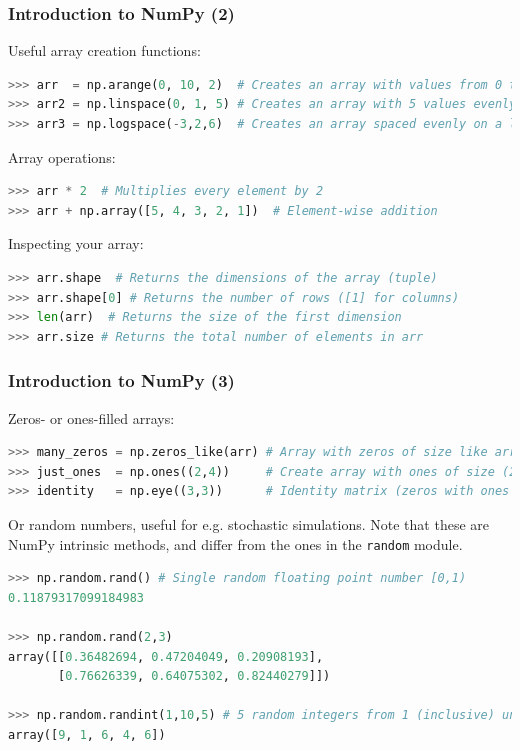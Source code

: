 \begin{frame}[fragile]
  \frametitle{Introduction to NumPy (2)}
  Useful array creation functions:
  \begin{lstlisting}[language=Python, numbers=none]
>>> arr  = np.arange(0, 10, 2)  # Creates an array with values from 0 to 10, step 2
>>> arr2 = np.linspace(0, 1, 5) # Creates an array with 5 values evenly spaced between 0 and 1
>>> arr3 = np.logspace(-3,2,6)  # Creates an array spaced evenly on a logscale
  \end{lstlisting}\pause

  Array operations:
  \begin{lstlisting}[language=Python, numbers=none]
>>> arr * 2  # Multiplies every element by 2
>>> arr + np.array([5, 4, 3, 2, 1])  # Element-wise addition
  \end{lstlisting}\pause
  
  Inspecting your array:
  \begin{lstlisting}[language=Python, numbers=none]
>>> arr.shape  # Returns the dimensions of the array (tuple)
>>> arr.shape[0] # Returns the number of rows ([1] for columns)
>>> len(arr)  # Returns the size of the first dimension
>>> arr.size # Returns the total number of elements in arr
  \end{lstlisting}
\end{frame}

\begin{frame}[fragile]
  \frametitle{Introduction to NumPy (3)}
  Zeros- or ones-filled arrays:
  \begin{lstlisting}[language=Python, numbers=none]
>>> many_zeros = np.zeros_like(arr) # Array with zeros of size like arr, also: np.zeros
>>> just_ones  = np.ones((2,4))     # Create array with ones of size (2,4), also: np.ones_like
>>> identity   = np.eye((3,3))      # Identity matrix (zeros with ones on the main diagonal)
    \end{lstlisting}\pause
      
    Or random numbers, useful for e.g. stochastic simulations. Note that these are NumPy intrinsic methods, and differ from the ones in the \lstinline|random| module.
    \begin{lstlisting}[language=Python, numbers=none]
>>> np.random.rand() # Single random floating point number [0,1)
0.11879317099184983

>>> np.random.rand(2,3)
array([[0.36482694, 0.47204049, 0.20908193],
       [0.76626339, 0.64075302, 0.82440279]])

>>> np.random.randint(1,10,5) # 5 random integers from 1 (inclusive) until 10 (exclusive)
array([9, 1, 6, 4, 6])
        \end{lstlisting}\pause
\end{frame}

